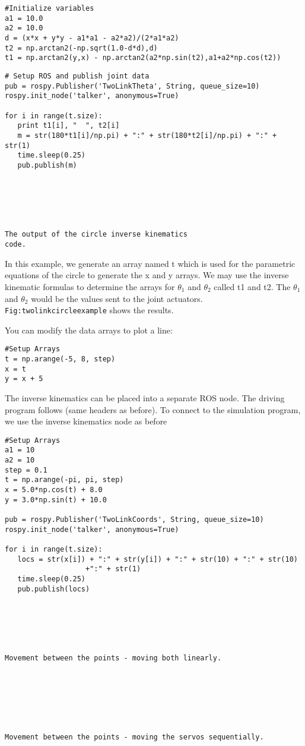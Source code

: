 \begin{verbatim}
#Initialize variables
a1 = 10.0
a2 = 10.0
d = (x*x + y*y - a1*a1 - a2*a2)/(2*a1*a2)
t2 = np.arctan2(-np.sqrt(1.0-d*d),d)
t1 = np.arctan2(y,x) - np.arctan2(a2*np.sin(t2),a1+a2*np.cos(t2))
\end{verbatim}

\begin{verbatim}
# Setup ROS and publish joint data
pub = rospy.Publisher('TwoLinkTheta', String, queue_size=10)
rospy.init_node('talker', anonymous=True)

for i in range(t.size):
   print t1[i], "  ", t2[i]
   m = str(180*t1[i]/np.pi) + ":" + str(180*t2[i]/np.pi) + ":" + str(1)
   time.sleep(0.25)
   pub.publish(m)






The output of the circle inverse kinematics
code.
\end{verbatim}

In this example, we generate an array named t which is used for the
parametric equations of the circle to generate the x and y arrays. We
may use the inverse kinematic formulas to determine the arrays for
\(\theta_1\) and \(\theta_2\) called t1 and t2. The \(\theta_1\) and
\(\theta_2\) would be the values sent to the joint actuators.
\texttt{Fig:twolinkcircleexample} shows the results.

You can modify the data arrays to plot a line:

\begin{verbatim}
#Setup Arrays
t = np.arange(-5, 8, step)
x = t
y = x + 5
\end{verbatim}

The inverse kinematics can be placed into a separate ROS node. The
driving program follows (same headers as before). To connect to the
simulation program, we use the inverse kinematics node as before

\begin{verbatim}
#Setup Arrays
a1 = 10
a2 = 10
step = 0.1
t = np.arange(-pi, pi, step)
x = 5.0*np.cos(t) + 8.0
y = 3.0*np.sin(t) + 10.0

pub = rospy.Publisher('TwoLinkCoords', String, queue_size=10)
rospy.init_node('talker', anonymous=True)

for i in range(t.size):
   locs = str(x[i]) + ":" + str(y[i]) + ":" + str(10) + ":" + str(10)
                   +":" + str(1)
   time.sleep(0.25)
   pub.publish(locs)






Movement between the points - moving both linearly.







Movement between the points - moving the servos sequentially.
\end{verbatim}

